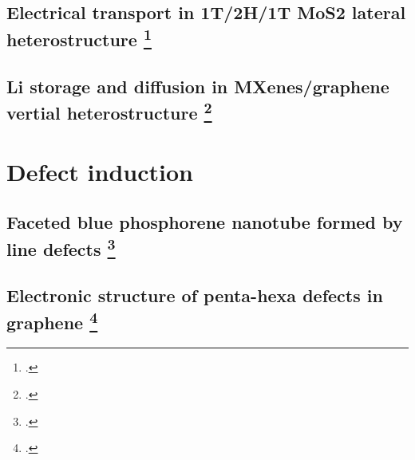 \subsection[Electrical transport in 1T/2H/1T MoS2 lateral heterostructure]{Electrical transport in 1T/2H/1T MoS2 lateral heterostructure \footcite[This work is submitted as:][]{Aierken2017.transport}}
\subsection[Li storage and diffusion in MXenes/graphene vertial heterostructure]{Li storage and diffusion in MXenes/graphene vertial heterostructure \footcite[This work will be published as:][]{Aierken2017.battery}}

\section{Defect induction}
\subsection[Faceted blue phosphorene nanotube formed by line defects]{Faceted blue phosphorene nanotube formed by line defects \footcite[This work is published in:][]{Aierken2015.nanotubes}}
\subsection[Electronic structure of penta-hexa defects in graphene]{Electronic structure of penta-hexa defects in graphene \footcite[This work is published in:][]{Aierken2016.magnetism}}
